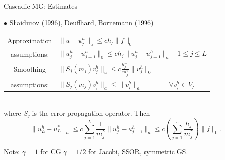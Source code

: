 \documentclass[landscape,pdftex,headrule,footrule]{foils}
\begin{document}
\begin{foil}{Cascadic MG: Estimates}
  
  $\bullet$ Shaidurov (1996), Deuflhard, Bornemann (1996)
 
  \small
  \begin{tabular}{cl}
    Approximation & \hspace*{3.5mm} $\| u - u_j^h \|_a  \le  c h_j \| f \|_0$\\[1.0ex]
    assumptions:  & $\| u_j^h - u_{j-1}^h \|_0  \le  c h_j \| u_j^h
                   - u_{j-1}^h\|_a \quad 1 \le j \le L$ \\[3.0ex]
    Smoothing     & $\| S_j(m_j) v_j^h \|_a  \le
                    c \frac{h_j^{-1}}{m_j^\gamma} \| v_j^h\|_0$ \\[1.0ex]
    assumptions:  & $\| S_j(m_j) v_j^h \|_a  \le \| v_j^h \|_a \qquad \qquad
                    \forall v_j^h \in V_j$\\[3.0ex]
  \end{tabular}\\
  where $S_j$ is the error propagation operator. Then
  $$
   \| u_L^h - u_L^* \|_a \le c \sum\limits_{j=1}^L \frac{1}{m_j^\gamma}
   \| u_j^h - u_{j-1}^h \|_a \le
   c \left( \sum\limits_{j=1}^L \frac{h_j}{m_j^\gamma} \right) \| f \|_0.
  $$
 
   \noindent Note:  $\gamma = 1$ for CG \newline
   \hphantom{Note:} $\gamma = 1/2$ for Jacobi, SSOR, symmetric GS.
   \normalsize
   
\end{foil}
\end{document}
